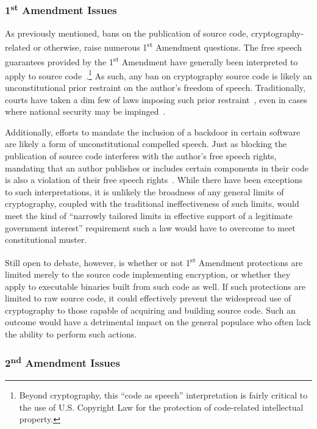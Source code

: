 \subsubsection{1\textsuperscript{st} Amendment Issues}

As previously mentioned, bans on the publication of source code,
cryptography-related or otherwise, raise numerous
1\textsuperscript{st} Amendment questions. The free speech guarantees
provided by the 1\textsuperscript{st} Amendment have generally been
interpreted to apply to source code~\cite{ninthcir-bernstein,
  sixthcir-junger}.\footnote{Beyond cryptography, this ``code as
  speech'' interpretation is fairly critical to the use of
  U.S. Copyright Law for the protection of code-related intellectual
  property.} As such, any ban on cryptography source code is likely an
unconstitutional prior restraint on the author's freedom of
speech. Traditionally, courts have taken a dim few of laws imposing
such prior restraint~\cite{scotus-nearvminnesota}, even in cases where
national security may be impinged~\cite{scotus-nytvus}.

Additionally, efforts to mandate the inclusion of a backdoor in
certain software are likely a form of unconstitutional compelled
speech. Just as blocking the publication of source code interferes
with the author's free speech rights, mandating that an author
publishes or includes certain components in their code is also a
violation of their free speech
rights~\cite{scotus-wooleyvmaynard}. While there have been exceptions
to such interpretations, it is unlikely the broadness of any general
limits of cryptography, coupled with the traditional ineffectiveness
of such limits, would meet the kind of ``narrowly tailored limits in
effective support of a legitimate government interest'' requirement
such a law would have to overcome to meet constitutional muster.

Still open to debate, however, is whether or not 1\textsuperscript{st}
Amendment protections are limited merely to the source code
implementing encryption, or whether they apply to executable binaries
built from such code as well. If such protections are limited to raw
source code, it could effectively prevent the widespread use of
cryptography to those capable of acquiring and building source
code. Such an outcome would have a detrimental impact on the general
populace who often lack the ability to perform such actions.

\subsubsection{2\textsuperscript{nd} Amendment Issues}

